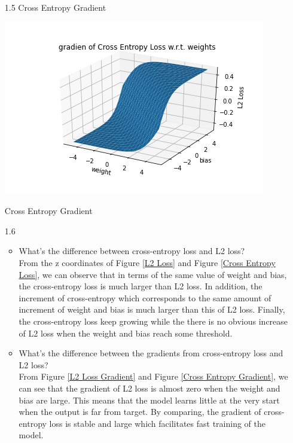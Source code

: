 \documentclass{article}
\begin{document}
\begin{enumerate}
        \item[1.5] 
    	Cross Entropy Gradient\\
    	\begin{minipage}[t]{\linewidth}
        	\captionsetup{type=figure}
            \centering
            \includegraphics[width=0.65\linewidth]{gradien of Cross Entropy Loss w.r.t. weights.png}
            \caption{Cross Entropy Gradient} 
            \label{Cross Entropy Gradient}     
        \end{minipage}
        
        \item[1.6]
        \begin{itemize}
        	\item
        	What's the difference between cross-entropy loss and L2 loss?\\
        	From the z coordinates of Figure \ref{L2 Loss} and Figure \ref{Cross Entropy Loss}, we can observe that in terms of the same value of weight and bias, the cross-entropy loss is much larger than L2 loss. In addition, the increment of cross-entropy which corresponds to the same amount of increment of weight and bias is much larger than this of L2 loss. Finally, the cross-entropy loss keep growing while the there is no obvious increase of L2 loss when the weight and bias reach some threshold.\\
        	
        	\item
        	What's
the difference between the gradients from cross-entropy loss and L2 loss?\\
        	From Figure \ref{L2 Loss Gradient} and Figure \ref{Cross Entropy Gradient}, we can see that the gradient of L2 loss is almost zero when the weight and bias are large. This means that the model learns little at the very start when the output is far from target. By comparing, the gradient of cross-entropy loss is stable and large which facilitates fast training of the model.\\


\end{itemize}
\end{enumerate}
\end{document}
